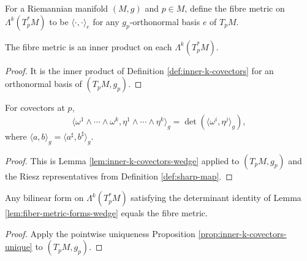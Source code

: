 \begin{definition}
\label{def:fiber-metric-forms-pointwise}





For a Riemannian manifold $(M,g)$ and $p\in M$, define the fibre metric on $\Lambda^k(T_p^*M)$ to be $\langle\cdot,\cdot\rangle_e$ for any $g_p$-orthonormal basis $e$ of $T_pM$.
\end{definition}

\begin{lemma}
\label{lem:fiber-metric-forms-inner-product}





The fibre metric is an inner product on each $\Lambda^k(T_p^*M)$.
\end{lemma}
\begin{proof}

\sketch It is the inner product of Definition \ref{def:inner-k-covectors} for an orthonormal basis of $(T_pM,g_p)$.
\end{proof}

\begin{lemma}
\label{lem:fiber-metric-forms-wedge}





For covectors at $p$,
\[
\langle\omega^1\wedge\cdots\wedge\omega^k,\eta^1\wedge\cdots\wedge\eta^k\rangle_g=\det(\langle\omega^i,\eta^j\rangle_g),
\]
where $\langle a,b\rangle_g=\langle a^\sharp,b^\sharp\rangle_g$.
\end{lemma}
\begin{proof}

\sketch This is Lemma \ref{lem:inner-k-covectors-wedge} applied to $(T_pM,g_p)$ and the Riesz representatives from Definition \ref{def:sharp-map}.
\end{proof}

\begin{lemma}
\label{lem:fiber-metric-forms-unique-pointwise}





Any bilinear form on $\Lambda^k(T_p^*M)$ satisfying the determinant identity of Lemma \ref{lem:fiber-metric-forms-wedge} equals the fibre metric.
\end{lemma}
\begin{proof}

\sketch Apply the pointwise uniqueness Proposition \ref{prop:inner-k-covectors-unique} to $(T_pM,g_p)$.
\end{proof}

